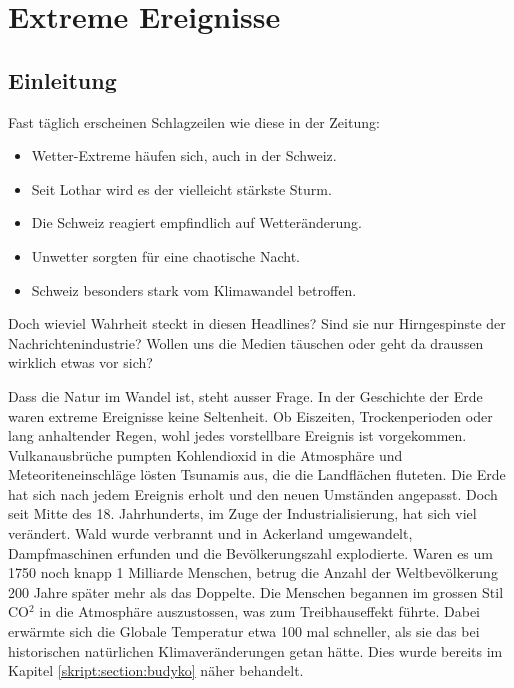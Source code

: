 %
%
%
\chapter{Extreme Ereignisse\label{chapter:thema}}
\begin{refsection}

\section{Einleitung}
Fast täglich erscheinen Schlagzeilen wie diese in der Zeitung:

\begin{itemize}
\item Wetter-Extreme häufen sich, auch in der Schweiz.
\item Seit Lothar wird es der vielleicht stärkste Sturm.
\item Die Schweiz reagiert empfindlich auf Wetteränderung.
\item Unwetter sorgten für eine chaotische Nacht.
\item Schweiz besonders stark vom Klimawandel betroffen.
\end{itemize}

Doch wieviel Wahrheit steckt in diesen Headlines? Sind sie nur Hirngespinste der Nachrichtenindustrie? Wollen uns die Medien täuschen oder geht da draussen wirklich etwas vor sich?

Dass die Natur im Wandel ist, steht ausser Frage. In der Geschichte der Erde waren extreme Ereignisse keine Seltenheit. Ob Eiszeiten, Trockenperioden oder lang anhaltender Regen, wohl jedes vorstellbare Ereignis ist vorgekommen. Vulkanausbrüche pumpten Kohlendioxid in die Atmosphäre und Meteoriteneinschläge lösten Tsunamis aus, die die Landflächen fluteten. Die Erde hat sich nach jedem Ereignis erholt und den neuen Umständen angepasst. Doch seit Mitte des 18. Jahrhunderts, im Zuge der Industrialisierung, hat sich viel verändert. Wald wurde verbrannt und in Ackerland umgewandelt, Dampfmaschinen erfunden und die Bevölkerungszahl explodierte. Waren es um 1750 noch knapp 1 Milliarde Menschen, betrug die Anzahl der Weltbevölkerung 200 Jahre später mehr als das Doppelte. Die Menschen begannen im grossen Stil CO$^2$ in die Atmosphäre auszustossen, was zum Treibhauseffekt führte. Dabei erwärmte sich die Globale Temperatur etwa 100 mal schneller, als sie das bei historischen natürlichen Klimaveränderungen getan hätte. Dies wurde bereits im Kapitel \ref{skript:section:budyko} näher behandelt. 


\end{refsection}
